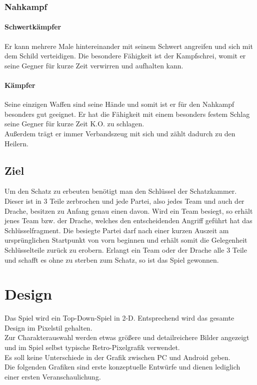 \documentclass[10pt,a4paper,notitlepage]{report}
\begin{document}
\begin{flushleft}
\subsection{Nahkampf}
\subsubsection{Schwertkämpfer}
Er kann mehrere Male hintereinander mit seinem Schwert angreifen und sich mit dem Schild verteidigen. Die besondere Fähigkeit ist der Kampfschrei, womit er seine Gegner für kurze Zeit verwirren und aufhalten kann.\\
\subsubsection{Kämpfer}
Seine einzigen Waffen sind seine Hände und somit ist er für den Nahkampf besonders gut geeignet. Er hat die Fähigkeit mit einem besonders festem Schlag seine Gegner für kurze Zeit K.O. zu schlagen.\\
Außerdem trägt er immer Verbandszeug mit sich und zählt dadurch zu den Heilern.\\
\section{Ziel}
Um den Schatz zu erbeuten benötigt man den Schlüssel der Schatzkammer. Dieser ist in 3 Teile zerbrochen und jede Partei, also jedes Team und auch der Drache, besitzen zu Anfang genau einen davon. Wird ein Team besiegt, so erhält jenes Team bzw. der Drache, welches den entscheidenden Angriff geführt hat das Schlüsselfragment. Die besiegte Partei darf nach einer kurzen Auszeit am ursprünglichen Startpunkt von vorn beginnen und erhält somit die Gelegenheit Schlüsselteile zurück zu erobern. Erlangt ein Team oder der Drache alle 3 Teile und schafft es ohne zu sterben zum Schatz, so ist das Spiel gewonnen.\\

\chapter{Design}
Das Spiel wird ein Top-Down-Spiel in 2-D. Entsprechend wird das gesamte Design im Pixelstil gehalten.\\
Zur Charakterauswahl werden etwas größere und detailreichere Bilder angezeigt und im Spiel selbst typische Retro-Pixelgrafik verwendet.\\
Es soll keine Unterschiede in der Grafik zwischen PC und Android geben.\\
Die folgenden Grafiken sind erste konzeptuelle Entwürfe und dienen lediglich einer ersten Veranschaulichung.\\


\end{flushleft}
\end{document}
